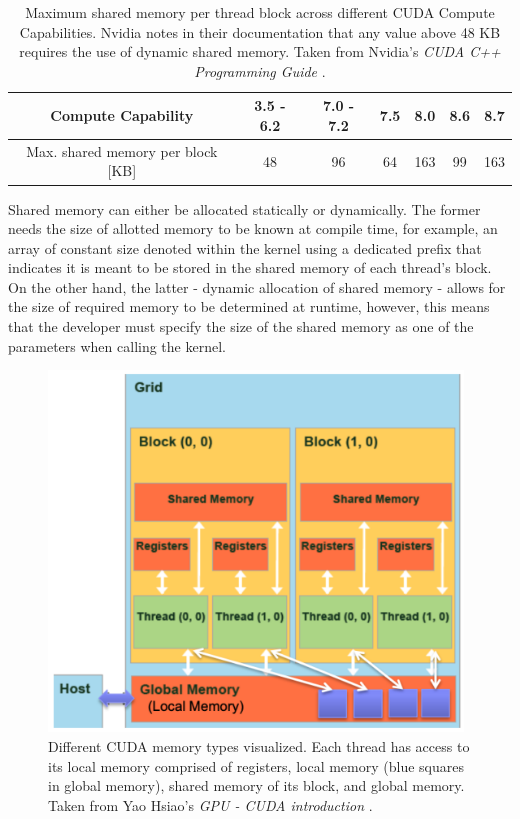 \begin{table}[ht!]
	\centering
	\renewcommand{\arraystretch}{1.5}
	\begin{tabular}{ |c|c|c|c|c|c|c| } 
		\hline
		Compute Capability & 3.5 - 6.2 & 7.0 - 7.2 & 7.5 & 8.0 & 8.6 & 8.7 \\
		\hline
		Max. shared memory per block [KB] & 48 & 96 & 64 & 163 & 99 & 163 \\
		\hline
	\end{tabular}
	\caption{Maximum shared memory per thread block across different CUDA Compute Capabilities. Nvidia notes in their documentation that any value above 48 KB requires the use of dynamic shared memory. Taken from Nvidia's \emph{CUDA C++ Programming Guide} \cite{NVIDIAMay2022}.}
	\label{Table:theory-CUDA-block-max-shared-memory}
\end{table}

Shared memory can either be allocated statically or dynamically. The former needs the size of allotted memory to be known at compile time, for example, an array of constant size denoted within the kernel using a dedicated prefix that indicates it is meant to be stored in the shared memory of each thread's block. On the other hand, the latter - dynamic allocation of shared memory - allows for the size of required memory to be determined at runtime, however, this means that the developer must specify the size of the shared memory as one of the parameters when calling the kernel.

\begin{figure}[ht!]
	\centering
	\includegraphics[width=11cm, keepaspectratio]{images/ch1/CUDA_memory_types_detailed.png}
	\caption{Different CUDA memory types visualized. Each thread has access to its local memory comprised of registers, local memory (blue squares in global memory), shared memory of its block, and global memory. Taken from Yao Hsiao's \emph{GPU - CUDA introduction} \cite{Hsiao17December2019}.}
	\label{Figure:theory-CUDA-memory-types-detailed}
\end{figure}

